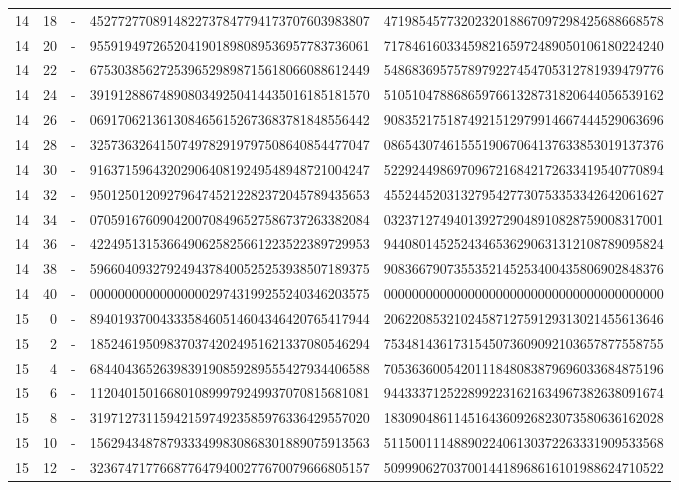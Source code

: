 \begin{longtable}{rrrll}
14 & 18 & - & 4527727708914822737847794173707603983807 & 4719854577320232018867097298425688668578 \\
14 & 20 & - & 9559194972652041901898089536957783736061 & 7178461603345982165972489050106180224240 \\
14 & 22 & - & 6753038562725396529898715618066088612449 & 5486836957578979227454705312781939479776 \\
14 & 24 & - & 3919128867489080349250414435016185181570 & 5105104788686597661328731820644056539162 \\
14 & 26 & - & 0691706213613084656152673683781848556442 & 9083521751874921512979914667444529063696 \\
14 & 28 & - & 3257363264150749782919797508640854477047 & 0865430746155519067064137633853019137376 \\
14 & 30 & - & 9163715964320290640819249548948721004247 & 5229244986970967216842172633419540770894 \\
14 & 32 & - & 9501250120927964745212282372045789435653 & 4552445203132795427730753353342642061627 \\
14 & 34 & - & 0705916760904200708496527586737263382084 & 0323712749401392729048910828759008317001 \\
14 & 36 & - & 4224951315366490625825661223522389729953 & 9440801452524346536290631312108789095824 \\
14 & 38 & - & 5966040932792494378400525253938507189375 & 9083667907355352145253400435806902848376 \\
14 & 40 & - & 0000000000000000029743199255240346203575 & 0000000000000000000000000000000000000000 \\
15 & 0 & - & 8940193700433358460514604346420765417944 & 2062208532102458712759129313021455613646 \\
15 & 2 & - & 1852461950983703742024951621337080546294 & 7534814361731545073609092103657877558755 \\
15 & 4 & - & 6844043652639839190859289555427934406588 & 7053636005420111848083879696033684875196 \\
15 & 6 & - & 1120401501668010899979249937070815681081 & 9443337125228992231621634967382638091674 \\
15 & 8 & - & 3197127311594215974923585976336429557020 & 1830904861145164360926823073580636162028 \\
15 & 10 & - & 1562943487879333499830868301889075913563 & 5115001114889022406130372263331909533568 \\
15 & 12 & - & 3236747177668776479400277670079666805157 & 5099906270370014418968616101988624710522 \\

\end{longtable}
